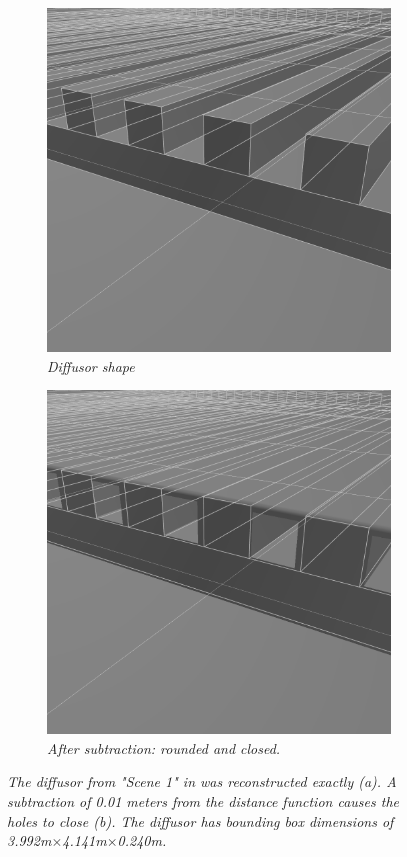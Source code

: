 \documentclass[twoside,a4paper]{article}
\begin{document}
\begin{figure}[ht]
\centering
\begin{subfigure}[t]{0.2\textwidth}
  \centering
  \includegraphics[width=0.9\linewidth]{img/diffusorNorm.png}
  \caption{\it Diffusor shape}
  \label{fig:diffNorm}
\end{subfigure}%
\begin{subfigure}[t]{0.2\textwidth}
  \centering
  \includegraphics[width=0.9\linewidth]{img/diffusorSmooth.png}
  \caption{\it After subtraction: rounded and closed.}
  \label{fig:sub2}
\end{subfigure}
\caption{\it The diffusor from "Scene 1" in \cite{brinkmann_round_2019} was reconstructed exactly (a). A subtraction of 0.01 meters from the distance function causes the holes to close (b). The diffusor has bounding box dimensions of 3.992m$\times$4.141m$\times$0.240m.}
\label{fig:diffSmooth}
\end{figure}
\end{document}
